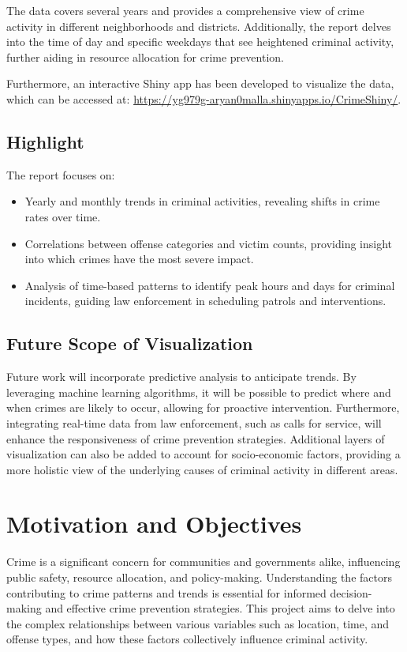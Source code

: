 \documentclass{article}
\begin{document}
The data covers several years and provides a comprehensive view of crime activity in different neighborhoods and districts. Additionally, the report delves into the time of day and specific weekdays that see heightened criminal activity, further aiding in resource allocation for crime prevention.

Furthermore, an interactive Shiny app has been developed to visualize the data, which can be accessed at: \url{https://yg979g-aryan0malla.shinyapps.io/CrimeShiny/}.


\subsection{Highlight}
The report focuses on:
\begin{itemize}
    \item Yearly and monthly trends in criminal activities, revealing shifts in crime rates over time.
    \item Correlations between offense categories and victim counts, providing insight into which crimes have the most severe impact.
    \item Analysis of time-based patterns to identify peak hours and days for criminal incidents, guiding law enforcement in scheduling patrols and interventions.
\end{itemize}


\subsection{Future Scope of Visualization}
Future work will incorporate predictive analysis to anticipate trends. By leveraging machine learning algorithms, it will be possible to predict where and when crimes are likely to occur, allowing for proactive intervention. Furthermore, integrating real-time data from law enforcement, such as calls for service, will enhance the responsiveness of crime prevention strategies. Additional layers of visualization can also be added to account for socio-economic factors, providing a more holistic view of the underlying causes of criminal activity in different areas.

\section{Motivation and Objectives}
\label{sec:motivation}
Crime is a significant concern for communities and governments alike, influencing public safety, resource allocation, and policy-making. Understanding the factors contributing to crime patterns and trends is essential for informed decision-making and effective crime prevention strategies. This project aims to delve into the complex relationships between various variables such as location, time, and offense types, and how these factors collectively influence criminal activity.
\end{document}
